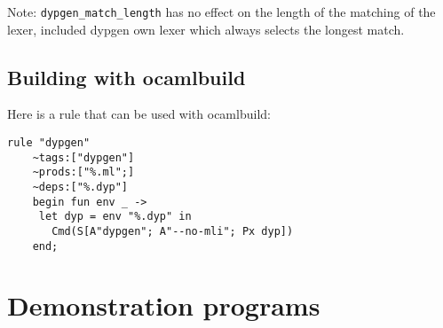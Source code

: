 \documentclass[12pt]{article}
\begin{document}
{Note: \verb|dypgen_match_length| has no effect on the length of the matching of the lexer, included dypgen own lexer which always selects the longest match.

\subsection{Building with ocamlbuild}

Here is a rule that can be used with ocamlbuild:
\begin{verbatim}
rule "dypgen"
    ~tags:["dypgen"]
    ~prods:["%.ml";]
    ~deps:["%.dyp"]
    begin fun env _ ->
     let dyp = env "%.dyp" in
       Cmd(S[A"dypgen"; A"--no-mli"; Px dyp])
    end;
\end{verbatim}





\section{Demonstration programs}

}
\end{document}
